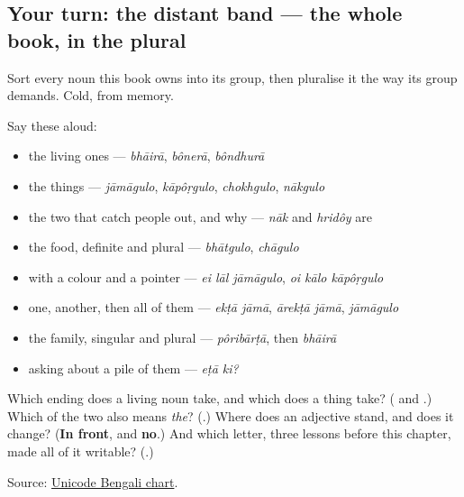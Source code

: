 \subsection*{Your turn: the distant band — the whole book, in the plural}
Sort every noun this book owns into its group, then pluralise it the way its group demands. Cold, from memory.

Say these aloud:

\begin{itemize}
\raggedright
  \item the living ones — \emph{bhāirā}, \emph{bônerā}, \emph{bôndhurā}
  \item the things — \emph{jāmāgulo}, \emph{kāpôṛgulo}, \emph{chokhgulo}, \emph{nākgulo}
  \item the two that catch people out, and why — \emph{nāk} and \emph{hridôy} are \textbf{}
  \item the food, definite and plural — \emph{bhātgulo}, \emph{chāgulo}
  \item with a colour and a pointer — \emph{ei lāl jāmāgulo}, \emph{oi kālo kāpôṛgulo}
  \item one, another, then all of them — \emph{ekṭā jāmā}, \emph{ārekṭā jāmā}, \emph{jāmāgulo}
  \item the family, singular and plural — \emph{pôribārṭā}, then \emph{bhāirā}
  \item asking about a pile of them — \emph{eṭā ki?}
\end{itemize}

\begin{tcolorbox}[breakable,colback=teal!4,colframe=teal!35!black,title={Before you move on}]
Which ending does a living noun take, and which does a thing take? (\textbf{} and \textbf{}.) Which of the two also means \emph{the}? (\textbf{}.) Where does an adjective stand, and does it change? (\textbf{In front}, and \textbf{no}.) And which letter, three lessons before this chapter, made all of it writable? (\textbf{}.)

Source: \href{https://www.unicode.org/charts/PDF/U0980.pdf}{Unicode Bengali chart}.
\end{tcolorbox}
